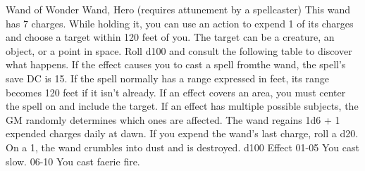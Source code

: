 Wand of Wonder
Wand, Hero (requires attunement by a spellcaster)
This wand has 7 charges. While holding it, you can use an action to expend 1 of its charges and choose a target within 120 feet of you. The target can be a creature, an object, or a point in space. Roll d100 and consult the following table to discover what happens.
If the effect causes you to cast a spell fromthe wand, the spell's save DC is 15. If the spell normally has a range expressed in feet, its range becomes 120 feet if it isn't already.
If an effect covers an area, you must center the spell on and include the target. If an effect has
multiple possible subjects, the GM randomly determines which ones are affected.  The wand regains 1d6 + 1 expended charges daily at dawn. If you expend the wand's last charge, roll a d20. On a 1, the wand crumbles into dust and is destroyed.
d100                                              Effect                                                                                                                                                                                                                                                                                                                                                                                                                                                                                                                                                                                                                  
01-05                                             You cast  slow.                                                                                                                                                                                                                                                                                                                                                                                                                                                                                                                                                                                                         
06-10                                             You cast faerie fire.                                                                                                                                                                                                                                                                                                                                                                                                                                                                                                                                                                                                   
